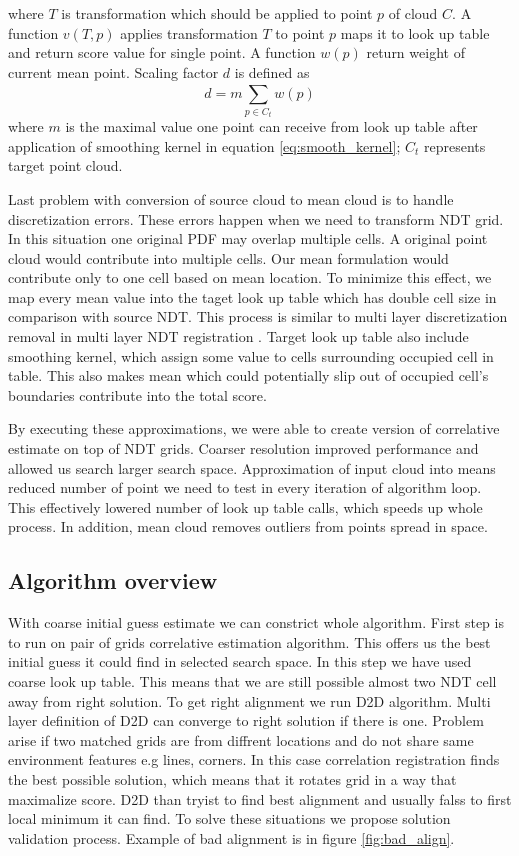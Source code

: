 where $T$ is transformation which should be applied to point $p$ of cloud $C$. A function $v(T,p)$ applies transformation $T$ to point $p$ maps it to look up table and return score value for single point. A function $w(p)$ return weight of current mean point. Scaling factor $d$ is defined as
\begin{equation}
d = m\sum_{p \in C_{t}}^{}w(p)
\end{equation} 
where $m$ is the maximal value one point can receive from look up table after application of smoothing kernel in equation \ref{eq:smooth_kernel}; $C_{t}$ represents target point cloud. 

Last problem with conversion of source cloud to mean cloud is to handle discretization errors. These errors happen when we need to transform \gls{NDT} grid. In this situation one original \gls{PDF} may overlap multiple cells. A original point cloud would contribute into multiple cells. Our mean formulation would contribute only to one cell based on mean location. To minimize this effect, we map every mean value into the taget look up table which has double cell size in comparison with source \gls{NDT}. This process is similar to multi layer discretization removal in multi layer \gls{NDT} registration \cite{ulas20113d}. Target look up table also include smoothing kernel, which assign some value to cells surrounding occupied cell in table. This also makes mean which could potentially slip out of occupied cell's boundaries contribute into the total score.

By executing these approximations, we were able to create version of correlative estimate on top of \gls{NDT} grids. Coarser resolution improved performance and allowed us search larger search space. Approximation of input cloud into means reduced number of point we need to test in every iteration of algorithm loop. This effectively lowered number of look up table calls, which speeds up whole process. In addition, mean cloud removes outliers from points spread in space.

\subsection{Algorithm overview}
With coarse initial guess estimate we can  constrict whole algorithm. First step is to run on pair of grids correlative estimation algorithm. This offers us the best initial guess it could find in selected search space. In this step we have used coarse look up table. This means that we are still possible almost two \gls{NDT} cell away from right solution. To get right alignment we run \gls{D2D} algorithm. Multi layer definition of \gls{D2D} can converge to right solution if there is one. Problem arise if two matched grids are from diffrent locations and do not share same environment features e.g lines, corners. In this case correlation registration finds the best possible solution, which means that it rotates grid in a way that maximalize score. \gls{D2D} than tryist to find best alignment and usually falss to first local minimum it can find. To solve these situations we propose solution validation process. Example of bad alignment is in figure \ref{fig:bad_align}. 



